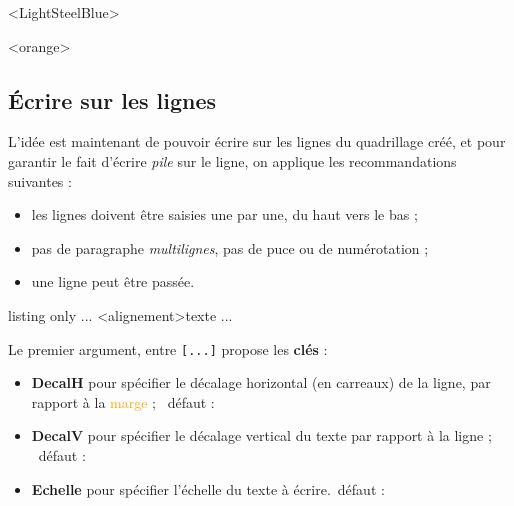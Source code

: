 \documentclass[a4paper]{article}
\newcommand\Cle[1]{{\bfseries\sffamily\textlangle #1\textrangle}}
\begin{document}
\medskip

\begin{EnvQuadrillage}[NbCarreaux=30x5,Cadre]
\end{EnvQuadrillage}

\smallskip

\begin{EnvQuadrillage}[NbCarreaux=36x8,Elargir=3/3,Cadre]<LightSteelBlue>
\end{EnvQuadrillage}

\begin{center}
	\begin{EnvQuadrillage}[NbCarreaux=15x5,Elargir=1/2,Seyes,Cadre]<orange>
\end{EnvQuadrillage}
\end{center}

\pagebreak

\subsection{Écrire sur les lignes}

L'idée est maintenant de pouvoir écrire sur les lignes du quadrillage créé, et pour garantir le fait d'écrire \textit{pile} sur le ligne, on applique les recommandations suivantes :

\begin{itemize}
	\item les lignes doivent être saisies une par une, du \og haut \fg{} vers le \og bas \fg{} ;
	\item pas de paragraphe \textit{multilignes}, pas de puce ou de numérotation ;
	\item une ligne peut être passée.
\end{itemize}

\begin{PresentationCode}{listing only}
...
	\EcrireLigne[clés]<alignement>{texte}
	\PasseLigne
...
\end{PresentationCode}

Le premier argument, entre \texttt{[...]} propose les \Cle{clés} :

\begin{itemize}
	\item \Cle{DecalH} pour spécifier le décalage horizontal (en carreaux) de la ligne, par rapport à la \textcolor{orange}{marge} ; \hfill~défaut : \Cle{0}
	\item \Cle{DecalV} pour spécifier le décalage vertical du texte par rapport à la ligne ; \hfill~défaut : \Cle{0pt}
	\item \Cle{Echelle} pour spécifier l'échelle du texte à écrire.\hfill~défaut : \Cle{1}
\end{itemize}
\end{document}
